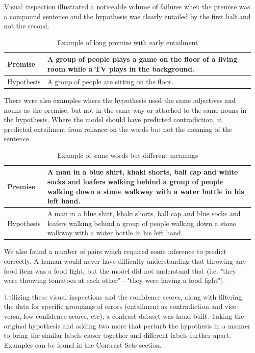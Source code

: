 \documentclass[11pt]{article}
\begin{document}
Visual inspection illustrated a noticeable volume of failures when the premise was a compound sentence and the hypothesis was clearly entailed by the first half and not the second.  
\begin{table}[h!]
    \centering
    \begin{tabularx}{0.45\textwidth} { 
  | >{\raggedright\arraybackslash}X 
  | >{\raggedright\arraybackslash}X | }
    \hline
        Premise & A group of people plays a game on the floor of a living room while a TV plays in the background.\\
        \hline
        Hypothesis & A group of people are sitting on the floor.\\
        \hline
    \end{tabularx}
    \caption{Example of long premise with early entailment}
    \label{tab:1sthalfentailment}
\end{table}
There were also examples where the hypothesis used the same adjectives and nouns as the premise, but not in the same way or attached to the same nouns in the hypothesis. Where the model should have predicted contradiction, it predicted entailment from reliance on the words but not the meaning of the sentence.
\begin{table}[h!]
    \centering
    \begin{tabularx}{0.45\textwidth} { 
  | >{\raggedright\arraybackslash}X 
  | >{\raggedright\arraybackslash}X | }
    \hline
        Premise & A man in a blue shirt, khaki shorts, ball cap and white socks and loafers walking behind a group of people walking down a stone walkway with a water bottle in his left hand.\\
        \hline
        Hypothesis & A man in a blue shirt, khaki shorts, ball cap and blue socks and loafers walking behind a group of people walking down a stone walkway with a water bottle in his left hand.\\
        \hline
    \end{tabularx}
    \caption{Example of same words but different meanings}
    \label{tab:samewordswrongmeaning}
\end{table}
We also found a number of pairs which required some inference to predict correctly. A human would never have difficulty understanding that throwing any food item was a food fight, but the model did not understand that (i.e. "they were throwing tomatoes at each other" - "they were having a food fight").

Utilizing these visual inspections and the confidence scores, along with filtering the data for specific groupings of errors (entailment as contradiction and vice versa, low confidence scores, etc), a contrast dataset was hand built.  Taking the original hypothesis and adding two more that perturb the hypothesis in a manner to bring the similar labels closer together and different labels further apart.  Examples can be found in the Contrast Sets section.
\end{document}
